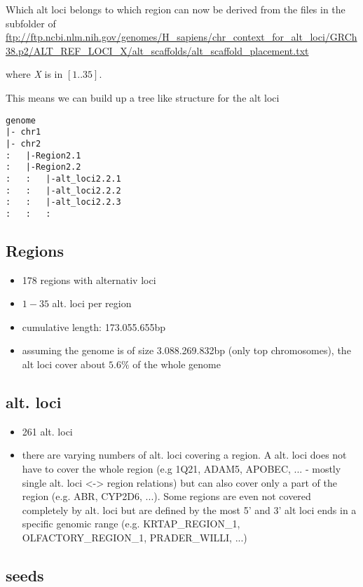 \documentclass[10pt,a4paper]{article}
\begin{document}
Which alt loci belongs to which region can now be derived from the files in the
subfolder of  \\
\url{ftp://ftp.ncbi.nlm.nih.gov/genomes/H_sapiens/chr_context_for_alt_loci/GRCh38.p2/ALT_REF_LOCI_X/alt_scaffolds/alt_scaffold_placement.txt}

where \textit{X} is in $[1..35]$.

This means we can build up a tree like structure for the alt loci

\begin{verbatim}
genome
|- chr1
|- chr2
:   |-Region2.1
:   |-Region2.2
:   :   |-alt_loci2.2.1
:   :   |-alt_loci2.2.2
:   :   |-alt_loci2.2.3
:   :   :
\end{verbatim}


\subsection*{Regions}

\begin{itemize}
\item 178 regions with alternativ loci
\item $1 - 35$ alt. loci per region
\item cumulative length: 173.055.655bp
\item assuming the genome is of size 3.088.269.832bp (only top chromosomes), the alt loci cover about $5.6\%$ of the whole genome
\end{itemize}

\subsection*{alt. loci}

\begin{itemize}
\item 261 alt. loci
\item there are varying numbers of alt. loci covering a region. A alt. loci does not have to cover the whole region (e.g 1Q21, ADAM5, APOBEC, ... - mostly single alt. loci <-> region relations) but can also cover only a part of the region (e.g. ABR, CYP2D6, ...). Some regions are even not covered completely by alt. loci but are defined by the most 5' and 3' alt loci ends in a specific genomic range (e.g. KRTAP\_REGION\_1, OLFACTORY\_REGION\_1, PRADER\_WILLI, ...)
\end{itemize}

\subsection*{seeds}
\end{document}
